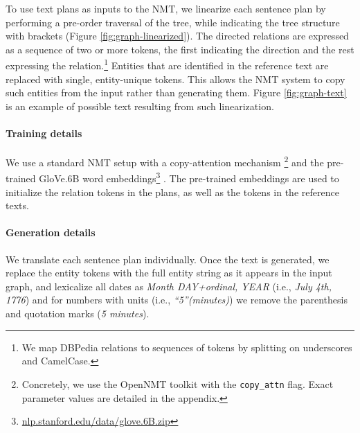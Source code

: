 \documentclass[11pt,a4paper]{article}
\begin{document}
To use text plans as inputs to the NMT, we linearize each sentence plan by performing a pre-order traversal of the tree, while indicating the tree structure with brackets (Figure \ref{fig:graph-linearized}). The directed relations  are expressed as a sequence of two or more tokens, the first indicating the direction and the rest expressing the relation.\footnote{We map DBPedia relations to sequences of tokens by splitting on underscores and CamelCase.}  
Entities that are identified in the reference text are replaced with single, entity-unique tokens. This allows the NMT system to copy such entities from the input rather than generating them.
Figure \ref{fig:graph-text} is an example of possible text resulting from such linearization.

\paragraph{Training details} 
We use a standard NMT setup with a copy-attention mechanism \cite{gulcehre2016pointing}\footnote{Concretely, we use the OpenNMT toolkit \cite{klein2017opennmt} with the \texttt{copy\_attn} flag. Exact parameter values are detailed in the appendix.}
and the pre-trained GloVe.6B word embeddings\footnote{\url{nlp.stanford.edu/data/glove.6B.zip}} \cite{pennington2014glove}.  The pre-trained embeddings are used to initialize the relation tokens in the plans, as well as the tokens in the reference texts. 

\paragraph{Generation details} 
We translate each sentence plan individually. Once the text is generated, we replace the entity tokens with the full entity string as it appears in the input graph, and lexicalize all dates as \emph{Month DAY+ordinal, YEAR} (i.e., \emph{July 4th, 1776}) and for numbers with units (i.e., \emph{``5''(minutes)}) we remove the parenthesis and quotation marks (\emph{5 minutes}). 
\end{document}
